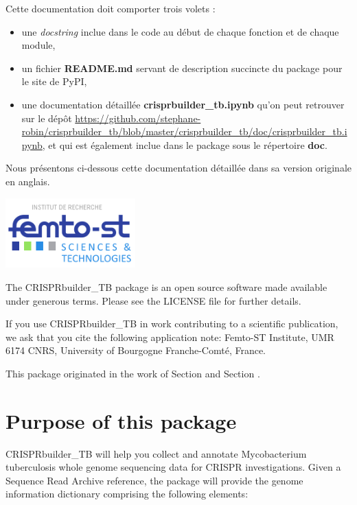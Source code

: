 \documentclass[twoside,a4paper,11pt,frenchb,openany]{report}
\begin{document}
Cette documentation doit comporter trois volets :
\begin{itemize}
\item une \textit{docstring} inclue dans le code au début de chaque fonction et de chaque module,
\item un fichier \textbf{README.md} servant de description succincte du package pour le site de PyPI,
\item une documentation détaillée \textbf{crisprbuilder\_tb.ipynb} qu'on peut retrouver sur le dépôt \url{https://github.com/stephane-robin/crisprbuilder_tb/blob/master/crisprbuilder_tb/doc/crisprbuilder_tb.ipynb}, et qui est également inclue dans le package sous le répertoire \textbf{doc}.
\end{itemize}   

Nous présentons ci-dessous cette documentation détaillée dans sa version originale en anglais.

\includegraphics[width=5cm]{femto.png}

The CRISPRbuilder\_TB package is an open source software made available
under generous terms. Please see the LICENSE file for further details.

If you use CRISPRbuilder\_TB in work contributing to a scientific
publication, we ask that you cite the following application note:
Femto-ST Institute, UMR 6174 CNRS, University of Bourgogne
Franche-Comté, France.

This package originated in the work of Section \cite{guyeux1} and
Section \cite{guyeux2}.



    \section{Purpose of this package}\label{purpose-of-this-package}

    CRISPRbuilder\_TB will help you collect and annotate Mycobacterium
tuberculosis whole genome sequencing data for CRISPR investigations.
Given a Sequence Read Archive reference, the package will provide the
genome information dictionary comprising the following elements:
\end{document}

